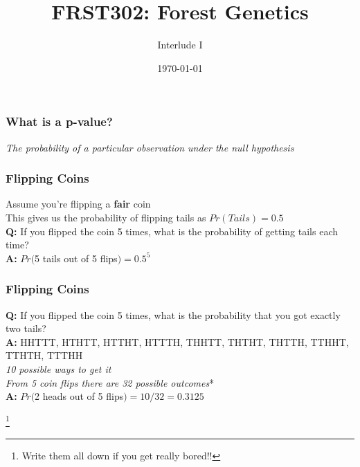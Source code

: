 \documentclass[xcolor=dvipsnames]{beamer}
\title{\Huge FRST302: Forest Genetics}
\author{\Large Interlude I}
\date{\today}
\newcommand\blfootnote[1]{%
	\begingroup
	\renewcommand\thefootnote{}\footnote{#1}%
	\addtocounter{footnote}{-1}%
	\endgroup
}
\begin{document}
	\maketitle

\begin{frame}
\frametitle{What is a p-value?}
\pause
\Large \textit{The probability of a particular observation under the null hypothesis}

\end{frame}


\begin{frame}
	\frametitle{Flipping Coins}
	Assume you're flipping a \textbf{fair} coin\\ \pause
	\vspace{10pt}
	This gives us the probability of flipping tails as $Pr(Tails)=0.5$\\ \pause
	\vspace{10pt}
	\textbf{Q:} If you flipped the coin 5 times, what is the probability of getting tails each time? \\ \pause
	\vspace{10pt}
	\textbf{A:} $Pr($5 tails out of 5 flips$) = 0.5^5$	
	

\end{frame}



\begin{frame}
	\frametitle{Flipping Coins}

	\textbf{Q:} If you flipped the coin 5 times, what is the probability that you got exactly two tails? \\ \pause	
	\vspace{10pt}
	\textbf{A:} HHTTT, HTHTT, HTTHT, HTTTH, THHTT, THTHT, THTTH, TTHHT, TTHTH, TTTHH\\
	\vspace{10pt}
	\textit{10 possible ways to get it } \\
	
	\vspace{10pt}
	\textit{From 5 coin flips there are 32 possible outcomes}* \\
	
	\vspace{10pt}
	\textbf{A:} $Pr($2 heads out of 5 flips$) = 10/32 = 0.3125$	

\blfootnote{Write them all down if you get really bored!!}

\end{frame}
\end{document}
